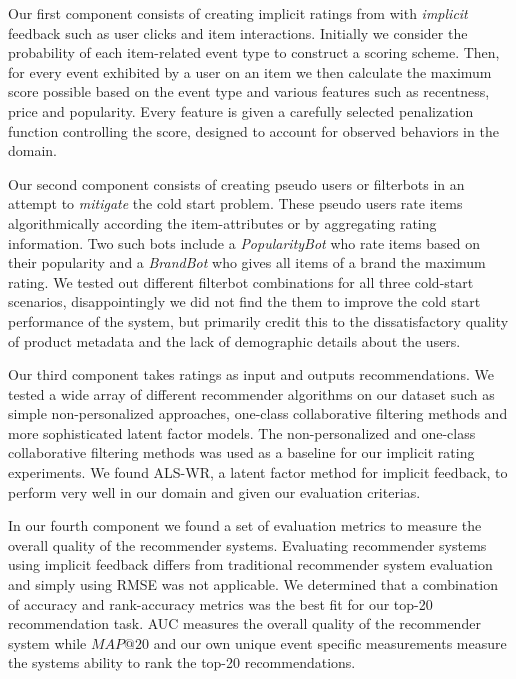 Our first component consists of creating implicit ratings from with
\textit{implicit} feedback such as user clicks and item interactions. Initially
we consider the probability of each item-related event type to construct a
scoring scheme. Then, for every event exhibited by a user on an item we then
calculate the maximum score possible based on the event type and various
features such as recentness, price and popularity. Every feature is given a
carefully selected penalization function controlling the score, designed to
account for observed behaviors in the domain.

Our second component consists of creating pseudo users or filterbots in an
attempt to \textit{mitigate} the cold start problem. These pseudo users rate
items algorithmically according the item-attributes or by aggregating rating
information. Two such bots include a \textit{PopularityBot} who rate items
based on their popularity and a \textit{BrandBot} who gives all items of a
brand the maximum rating. We tested out different filterbot combinations for
all three cold-start scenarios, disappointingly we did not find the them
to improve the cold start performance of the system, but primarily credit this
to the dissatisfactory quality of product metadata and the lack of demographic
details about the users.

Our third component takes ratings as input and outputs
recommendations. We tested a wide array of different recommender algorithms on
our dataset such as simple non-personalized approaches, one-class collaborative
filtering methods and more sophisticated latent factor models. The
non-personalized and one-class collaborative filtering methods was used as a
baseline for our implicit rating experiments. We found ALS-WR, a latent factor
method for implicit feedback, to perform very well in our domain and given our
evaluation criterias.

In our fourth component we found a set of evaluation metrics to measure the
overall quality of the recommender systems. Evaluating recommender systems
using implicit feedback differs from traditional recommender system evaluation
and simply using RMSE was not applicable. We determined that a combination of
accuracy and rank-accuracy metrics was the best fit for our top-20
recommendation task.  AUC measures the overall quality of the recommender
system while $MAP@20$ and our own unique event specific measurements measure
the systems ability to rank the top-20 recommendations.

